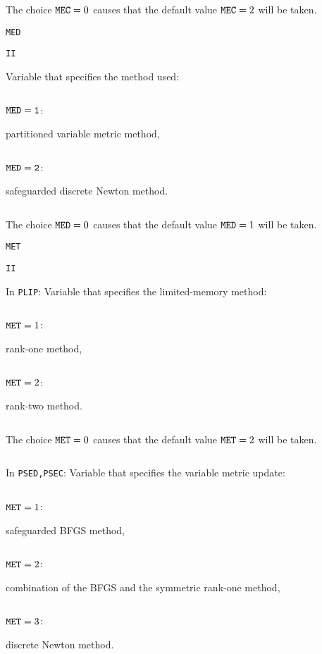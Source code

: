 \documentclass{esub2acm}
\begin{document}
\noindent\parbox{30mm}{$\;$}\parbox[t]{125mm}{The choice ${\tt MEC}=0$
  causes that the default value ${\tt MEC}=2$ will be taken.}
  \par\vspace{2mm}
\noindent\parbox{20mm}{\tt MED}\parbox{10mm}{\tt II}\parbox[t]{125mm}{
  Variable that specifies the method used:}
  \par\vspace{1mm}
\noindent\parbox{30mm}{$\;$}\parbox{24mm}{$\tt MED=1$:}\parbox[t]{101mm}{
  partitioned variable metric method,}
  \par
\noindent\parbox{30mm}{$\;$}\parbox{24mm}{$\tt MED=2$:}\parbox[t]{101mm}{
  safeguarded discrete Newton method.}
  \par\vspace{1mm}
\noindent\parbox{30mm}{$\;$}\parbox[t]{125mm}{The choice ${\tt MED}=0$
  causes that the default value ${\tt MED}=1$ will be taken.}
  \par\vspace{2mm}
\noindent\parbox{20mm}{\tt MET}\parbox{10mm}{\tt II}\parbox[t]{125mm}{
  In {\tt PLIP}: Variable that specifies the limited-memory method:}
  \par\vspace{1mm}
\noindent\parbox{30mm}{$\;$}\parbox{24mm}{${\tt MET}=1$:}\parbox[t]{101mm}{
  rank-one method,}
  \par
\noindent\parbox{30mm}{$\;$}\parbox{24mm}{${\tt MET}=2$:}\parbox[t]{101mm}{
  rank-two method.}
  \par\vspace{1mm}
\noindent\parbox{30mm}{$\;$}\parbox[t]{125mm}{The choice ${\tt MET}=0$
  causes that the default value ${\tt MET}=2$ will be taken.}
  \par\vspace{1mm}
\noindent \parbox{30mm}{$\;$}\parbox[t]{125mm}{In {\tt PSED,PSEC}: Variable
  that specifies the variable metric update:}
  \par\vspace{1mm}
\noindent\parbox{30mm}{$\;$}\parbox{24mm}{${\tt MET}=1$:}\parbox[t]{101mm}{
  safeguarded BFGS method,}
  \par
\noindent\parbox{30mm}{$\;$}\parbox{24mm}{${\tt MET}=2$:}\parbox[t]{101mm}{
  combination of the BFGS and the symmetric rank-one method,}
  \par
\noindent\parbox{30mm}{$\;$}\parbox{24mm}{${\tt MET}=3$:}\parbox[t]{101mm}{
  discrete Newton method.}
  \par\vspace{1mm}
\end{document}
